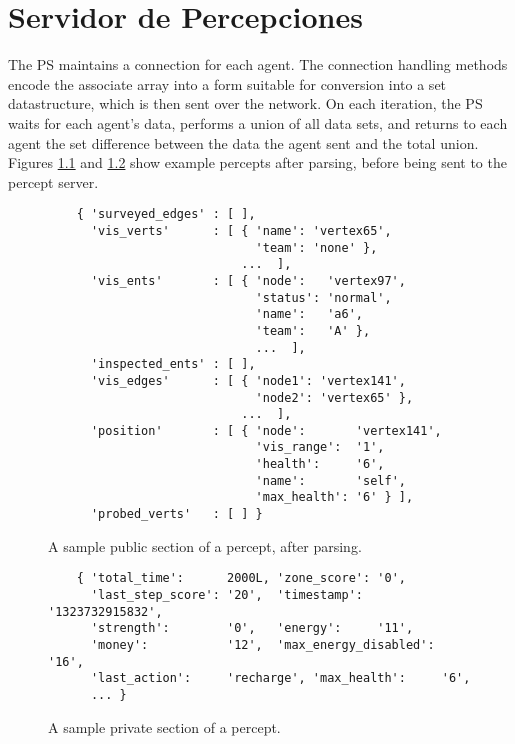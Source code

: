
\chapter{Servidor de Percepciones}
 \label{chap:servidor_de_percepciones}

    The PS maintains a connection for each agent.  The connection handling
    methods encode the associate array into a form suitable for conversion into
    a set datastructure, which is then sent over the network.  On each
    iteration, the PS waits for each agent's data, performs a union of all data
    sets, and returns to each agent the set difference between the data the
    agent sent and the total union.  Figures \ref{fig:pythonperceptpublic} and
    \ref{fig:pythonperceptprivate} show example percepts after parsing, before
    being sent to the percept server.

    \begin{figure}
    \centering
    
    \begin{small}
    \begin{verbatim}
    { 'surveyed_edges' : [ ], 
      'vis_verts'      : [ { 'name': 'vertex65',  
                             'team': 'none' }, 
                           ...  ],  
      'vis_ents'       : [ { 'node':   'vertex97',  
                             'status': 'normal', 
                             'name':   'a6',  
                             'team':   'A' }, 
                             ...  ],  
      'inspected_ents' : [ ],  
      'vis_edges'      : [ { 'node1': 'vertex141', 
                             'node2': 'vertex65' }, 
                           ...  ], 
      'position'       : [ { 'node':       'vertex141', 
                             'vis_range':  '1', 
                             'health':     '6', 
                             'name':       'self', 
                             'max_health': '6' } ], 
      'probed_verts'   : [ ] }
    \end{verbatim}
    \end{small}
    \caption{A sample public section of a percept, after parsing.}
    \label{fig:pythonperceptpublic}
    \end{figure}

    \begin{figure}
   


    \begin{verbatim}
    { 'total_time':      2000L, 'zone_score': '0',            
      'last_step_score': '20',  'timestamp':  '1323732915832',       
      'strength':        '0',   'energy':     '11',                  
      'money':           '12',  'max_energy_disabled': '16',                  
      'last_action':     'recharge', 'max_health':     '6',
      ... }
    \end{verbatim}
    \caption{A sample private section of a percept.}
    \label{fig:pythonperceptprivate}
    \end{figure}

